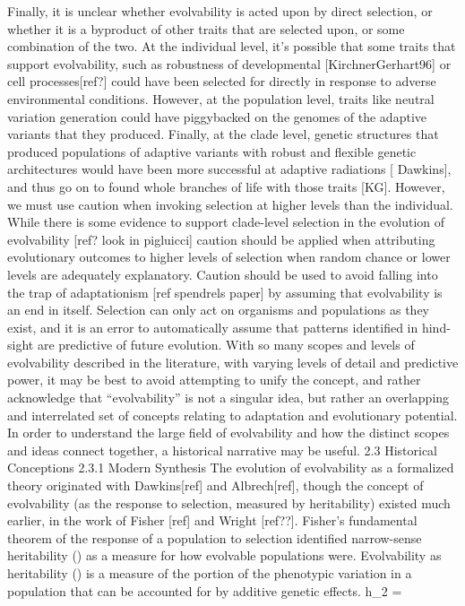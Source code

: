 Finally, it is unclear whether evolvability is acted upon by direct selection, or whether it is a byproduct of other traits that are selected upon, or some combination of the two. At the individual level, it’s possible that some traits that support evolvability, such as robustness of developmental [KirchnerGerhart96] or cell processes[ref?] could have been selected for directly in response to adverse environmental conditions. However, at the population level, traits like neutral variation generation could have piggybacked on the genomes of the adaptive variants that they produced. Finally, at the clade level, genetic structures that produced populations of adaptive variants with robust and flexible genetic architectures would have been more successful at adaptive radiations [ Dawkins], and thus go on to found whole branches of life with those traits [KG]. 
However, we must use caution when invoking selection at higher levels than the individual. While there is some evidence to support clade-level selection in the evolution of evolvability [ref? look in pigluicci] caution should be applied when attributing evolutionary outcomes to higher levels of selection when random chance or  lower levels are adequately explanatory. Caution should be used to avoid falling into the trap of adaptationism [ref spendrels paper] by assuming that evolvability is an end in itself. Selection can only act on organisms and populations as they exist, and it is an error to automatically assume that patterns identified in hind-sight are predictive of future evolution.
With so many scopes and levels of evolvability described in the literature, with varying levels of detail and predictive power, it may be best to avoid attempting to unify the concept, and rather acknowledge that “evolvability” is not a singular idea, but rather an overlapping and interrelated set of concepts relating to adaptation and evolutionary potential. In order to understand the large field of evolvability and how the distinct scopes and ideas connect together, a historical narrative may be useful.
2.3 Historical Conceptions
2.3.1 Modern Synthesis
The evolution of evolvability as a formalized theory originated with Dawkins[ref] and Albrech[ref], though the concept of evolvability (as the response to selection, measured by heritability) existed much earlier, in the work of Fisher [ref] and Wright [ref??].  Fisher’s fundamental theorem of the response of a population to selection identified narrow-sense heritability () as a measure for how evolvable populations were. Evolvability as heritability () is a measure of the portion of the phenotypic variation in a population that can be accounted for by additive genetic effects.
h_2 = 

